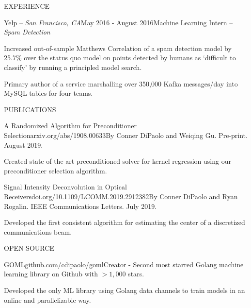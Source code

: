 \documentclass{resume} %
\begin{document}
\begin{rSection}{EXPERIENCE}
\begin{rSubsection}{Yelp -- {\it San Francisco, CA}}{May 2016 - August 2016}{Machine Learning Intern -- {\sl Spam Detection}}

\item Increased out-of-sample Matthews Correlation of a spam detection model by 25.7\% over the status quo model on points detected by humans as `difficult to classify' by running a principled model search.
\item Primary author of a service marshalling over 350,000 Kafka messages/day into MySQL tables for four teams.
\end{rSubsection}

\end{rSection}


\begin{rSection}{PUBLICATIONS}

\begin{rSubsection}{A Randomized Algorithm for Preconditioner Selection}{\textsf{arxiv.org/abs/1908.00633}}{By Conner DiPaolo and Weiqing Gu. Pre-print. August 2019.}

\item Created state-of-the-art preconditioned solver for kernel regression using our preconditioner selection algorithm.
\end{rSubsection}

\begin{rSubsection}{Signal Intensity Deconvolution in Optical Receivers}{\textsf{doi.org/10.1109/LCOMM.2019.2912382}}{By Conner DiPaolo and Ryan Rogalin. IEEE Communications Letters. July 2019.}

\item Developed the first consistent algorithm for estimating the center of a discretized communications beam.
\end{rSubsection}


\end{rSection}


\begin{rSection}{OPEN SOURCE}

\begin{rSubsection}{GOML}{\textsf{github.com/cdipaolo/goml}}{Creator - Second most starred Golang machine learning library on Github with $> 1,000$ stars.}

\item Developed the only ML library using Golang data channels to train models in an online and parallelizable way.
\end{rSubsection}

\end{rSection}
\end{document}
